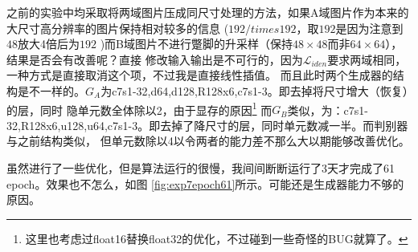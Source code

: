 \documentclass[twocolumn,11pt]{ctexart}
\begin{document}
之前的实验中均采取将两域图片压成同尺寸处理的方法，如果A域图片作为本来的大尺寸高分辨率的图片保持相对较多的信息
($192/times 192$，取$192$是因为注意到$48$放大4倍后为$192$
)而B域图片不进行蹩脚的升采样（保持$48\times 48$而非$64\times 64$），结果是否会有改善呢？直接
修改输入输出是不可行的，因为$\mathcal{L}_{iden}$要求两域相同，一种方式是直接取消这个项，不过我是直接线性插值。
而且此时两个生成器的结构是不一样的。$G_A$为c7s1-32,d64,d128,R128x6,c7s1-3。即去掉将尺寸增大（恢复）的层，同时
隐单元数全体除以2，由于显存的原因\footnote{这里也考虑过float16替换float32的优化，不过碰到一些奇怪的BUG就算了。}
而$G_B$类似，为：c7s1-32,R128x6,u128,u64,c7s1-3。即去掉了降尺寸的层，同时单元数减一半。而判别器与之前结构类似，
但单元数除以4以令两者的能力差不那么大以期能够改善优化。

虽然进行了一些优化，但是算法运行的很慢，我间间断断运行了3天才完成了61 epoch。效果也不怎么，如图 
\ref{fig:exp7epoch61}所示。可能还是生成器能力不够的原因。
\end{document}
